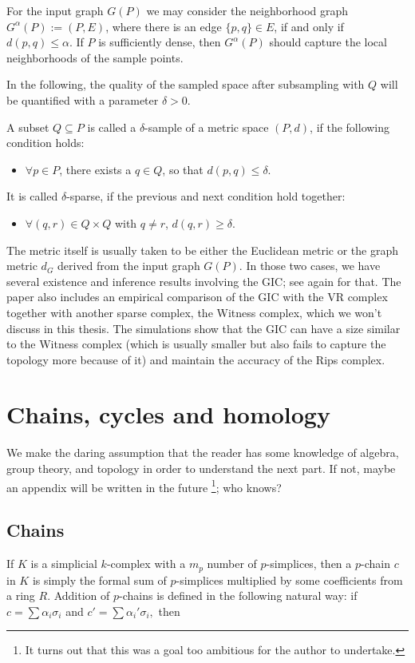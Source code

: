 For the input graph $G(P)$ we may consider the neighborhood graph $G^{\alpha}(P) := (P,E)$, where there is an edge $\{p,q\} \in E$, if and only if $d(p,q) \leq \alpha$. If $P$ is sufficiently dense, then $G^{\alpha}(P)$ should capture the local neighborhoods of the sample points.

In the following, the quality of the sampled space after subsampling with $Q$ will be quantified with a parameter $\delta > 0$.

\begin{definition}
  A subset $Q \subseteq P$ is called a $\delta$-sample of a metric space $(P,d)$, if the following condition holds:
  \begin{itemize}
    \item $\forall p \in P$, there exists a $q \in Q$, so that $d(p,q) \leq \delta$.
  \end{itemize}
  It is called $\delta$-sparse, if the previous and next condition hold together:
  \begin{itemize}
    \item $\forall (q,r) \in Q \times Q$ with $q \neq r$, $d(q,r) \geq \delta$.
  \end{itemize}
\end{definition}
The metric itself is usually taken to be either the Euclidean metric or the graph metric $d_{G}$ derived from the input graph $G(P)$. In those two cases, we have several existence and inference results involving the GIC; see \cite{dey2013graphinducedcomplexpoint} again for that. The paper also includes an empirical comparison of the GIC with the VR complex together with another sparse complex, the Witness complex, which we won't discuss in this thesis. The simulations show that the GIC can have a size similar to the Witness complex (which is usually smaller but also fails to capture the topology more because of it) and maintain the accuracy of the Rips complex.

\section{Chains, cycles and homology}
We make the daring assumption that the reader has some knowledge of algebra, group theory, and topology in order to understand the next part. If not, maybe an appendix will be written in the future \footnote{It turns out that this was a goal too ambitious for the author to undertake.}; who knows?

\subsection{Chains}
If $K$ is a simplicial $k$-complex with a $m_{p}$ number of $p$-simplices, then a $p$-chain $c$ in $K$ is simply the formal sum of $p$-simplices multiplied by some coefficients from a ring $R$. Addition of $p$-chains is defined in the following natural way: if $c = \sum \alpha_{i}\sigma_{i}$ and $c' = \sum \alpha_{i}'\sigma_{i},$ then

